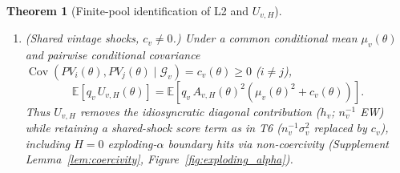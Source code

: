 \documentclass[12pt]{article}
\newtheorem{theorem}{Theorem}
\begin{document}
\begin{theorem}[Finite-pool identification of L2 and $U_{v,H}$]
\begin{enumerate}
  \item[\textbf{T8}] \emph{(Shared vintage shocks, $c_v \neq 0$.)} Under a common conditional mean $\mu_v(\theta)$ and pairwise conditional covariance $\operatorname{Cov}(PV_i(\theta),PV_j(\theta)\mid\mathcal{G}_v) = c_v(\theta) \ge 0$ ($i \neq j$),
  \[
  \mathbb{E}\!\left[q_v\,U_{v,H}(\theta)\right] = \mathbb{E}\!\left[q_v\,A_{v,H}(\theta)^2\left(\mu_v(\theta)^2 + c_v(\theta)\right)\right].
  \]
  Thus $U_{v,H}$ removes the idiosyncratic diagonal contribution ($h_v$; $n_v^{-1}$ EW) while retaining a shared-shock score term as in T6 ($n_v^{-1}\sigma_v^2$ replaced by $c_v$), including $H=0$ exploding-$\alpha$ boundary hits via non-coercivity (Supplement Lemma~\ref{lem:coercivity}, Figure~\ref{fig:exploding_alpha}).
\end{enumerate}
\end{theorem}
\end{document}
